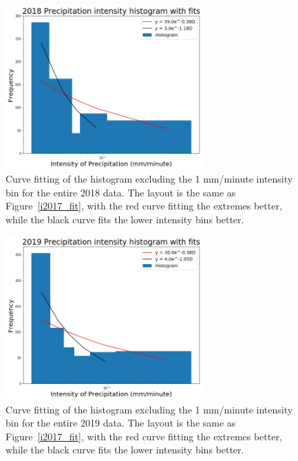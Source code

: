 \documentclass[11pt]{report}
\begin{document}
\begin{figure}[b]
  \centering
  \includegraphics[width=0.675\textwidth]{Figures/inten2018_fit.png}
  \caption[Fitting Intensity histogram for 2018 with different bins]
          {\label{i2018_fit} Curve fitting of the histogram excluding the 1
            mm/minute intensity bin for the entire 2018 data. The layout is
            the same as Figure~\ref{i2017_fit}, with the red curve fitting
            the extremes better, while the black curve fits the lower
            intensity bins better.}
\end{figure}

\clearpage
\begin{figure}[t]
  \centering
  \includegraphics[width=0.675\textwidth]{Figures/inten2019_fit.png}
  \caption[Fitting Intensity histogram for 2019 with different bins]
          {\label{i2019_fit} Curve fitting of the histogram excluding the 1
            mm/minute intensity bin for the entire 2019 data. The layout is
            the same as Figure~\ref{i2017_fit}, with the red curve fitting
            the extremes better, while the black curve fits the lower
            intensity bins better.  }
\end{figure}
\end{document}
